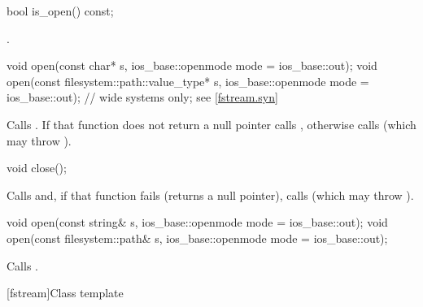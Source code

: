 %
\begin{itemdecl}
bool is_open() const;
\end{itemdecl}

\begin{itemdescr}
\pnum
\returns
{}.
\end{itemdescr}

%
\begin{itemdecl}
void open(const char* s, ios_base::openmode mode = ios_base::out);
void open(const filesystem::path::value_type* s,
          ios_base::openmode mode = ios_base::out);  // wide systems only; see \ref{fstream.syn}
\end{itemdecl}

\begin{itemdescr}
\pnum
\effects
Calls
.
If that function does not return a null pointer
calls ,
otherwise calls
(which may throw
).
\end{itemdescr}

%
\begin{itemdecl}
void close();
\end{itemdecl}

\begin{itemdescr}
\pnum
\effects
Calls
and, if that function fails (returns a null pointer), calls
(which may throw
).
\end{itemdescr}

%
\begin{itemdecl}
void open(const string& s, ios_base::openmode mode = ios_base::out);
void open(const filesystem::path& s, ios_base::openmode mode = ios_base::out);
\end{itemdecl}

\begin{itemdescr}
\pnum
\effects Calls .
\end{itemdescr}

[fstream]{Class template }

